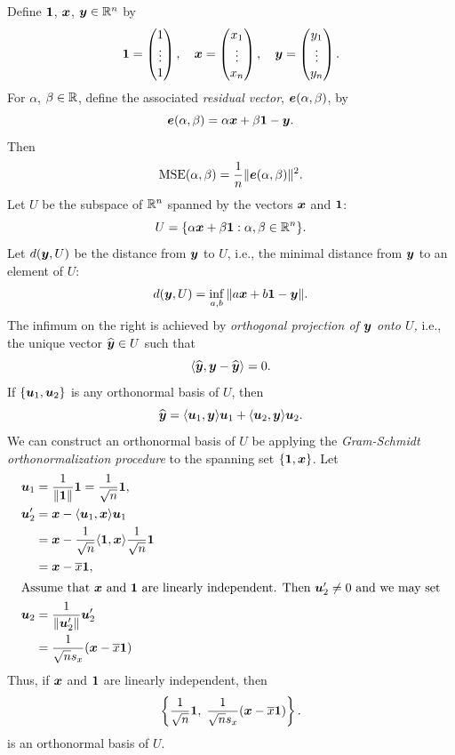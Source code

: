 \documentclass[12pt]{amsart}
\begin{document}
Define $\mathbf{1}$, $\boldsymbol{x}$, $\boldsymbol{y}\in\mathbb{R}^n$ by
\[
    \mathbf{1}= \begin{pmatrix}
        1\\\vdots\\1
    \end{pmatrix},\quad
    \boldsymbol{x}= \begin{pmatrix}
        x_1\\\vdots\\x_n
    \end{pmatrix},\quad
    \boldsymbol{y}= \begin{pmatrix}
        y_1\\\vdots\\y_n
    \end{pmatrix}.
\]
For $\alpha$, $\beta\in\mathbb{R}$, define the associated \emph{residual vector}, $\boldsymbol{e}(\alpha,\beta)$, by
\[    
    \boldsymbol{e}(\alpha,\beta)=\alpha\boldsymbol{x} + \beta\mathbf{1} - \boldsymbol{y}.
\]
Then
\[
    \operatorname{MSE}(\alpha,\beta) = \frac1n\|\boldsymbol{e}(\alpha,\beta)\|^2.
\]
Let $U$ be the subspace of $\mathbb{R}^n$ spanned by the vectors $\boldsymbol{x}$ and $\mathbf{1}$:
\[
U = \{\alpha\boldsymbol{x} + \beta\mathbf{1}: \alpha,\beta\in\mathbb{R}^n\}.
\]
Let $d(\boldsymbol{y}, U)$ be the distance from $\boldsymbol{y}$ to $U$, i.e.,
the minimal distance from $\boldsymbol{y}$ to an element of $U$:
\[
    d(\boldsymbol{y}, U) = \inf_{a,b}\|a\boldsymbol{x} + b\mathbf{1} - \boldsymbol{y}\|.
\]
The infimum on the right is achieved by \emph{orthogonal projection of $\boldsymbol{y}$ onto $U$,} i.e.,
the unique vector $\widehat{\boldsymbol{y}}\in U$ such that
\[
    \langle\widehat{\boldsymbol{y}}, \boldsymbol{y}-\widehat{\boldsymbol{y}}\rangle=0.
\]
If $\{\boldsymbol{u}_1,\boldsymbol{u}_2\}$ is any orthonormal basis of $U$, then
\[
    \widehat{\boldsymbol{y}} = \langle\boldsymbol{u}_1,\boldsymbol{y}\rangle\boldsymbol{u}_1 + \langle\boldsymbol{u}_2,\boldsymbol{y}\rangle\boldsymbol{u}_2. 
\]
We can construct an orthonormal basis of $U$ be applying the
\emph{Gram-Schmidt orthonormalization procedure} to the spanning set $\{\mathbf{1},\boldsymbol{x}\}$.
Let
\begin{align*}
    \boldsymbol{u}_1 &= \frac1{\|\mathbf{1}\|}\mathbf{1} = \frac1{\sqrt n}\mathbf{1},\\
    \boldsymbol{u}_2' &= \boldsymbol{x} - \langle\boldsymbol{u}_1, \boldsymbol{x}\rangle\boldsymbol{u}_1\\
    &= \boldsymbol{x} - \frac1{\sqrt n}\langle\mathbf{1},\boldsymbol{x}\rangle\frac1{\sqrt n}\mathbf{1}\\
    &= \boldsymbol{x} - \overline x\mathbf{1},\\
    \intertext{Assume that $\boldsymbol{x}$ and $\mathbf{1}$ are linearly independent. Then $\boldsymbol{u}_2'\neq 0$ and we may set}
    \boldsymbol{u}_2 &= \frac1{\|\boldsymbol{u}_2'\|}\boldsymbol{u}_2'\\
    &= \frac1{\sqrt n s_x}(\boldsymbol{x} - \overline x\mathbf{1})
\end{align*}
Thus, if $\boldsymbol{x}$ and $\mathbf{1}$ are linearly independent, then
\[
    \left\{\frac1{\sqrt n}\mathbf{1},\; \frac1{\sqrt n s_x}(\boldsymbol{x} - \overline x\mathbf{1})\right\}.
\]
is an orthonormal basis of $U$.
\end{document}

